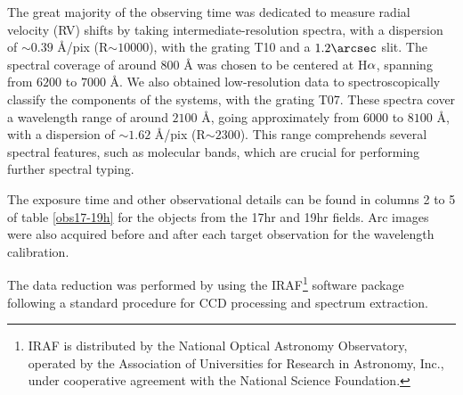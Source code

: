 \documentclass[fleqn,usenatbib]{mnras}
\begin{document}
The great majority of the observing time was dedicated to measure radial velocity (RV) shifts by taking intermediate-resolution spectra, with a dispersion of $\sim$$0.39$ \AA/pix (R$\sim$$10000$), with the grating T10 and a $1.2\arcsec$ slit. The spectral coverage of around $800$ \AA$ $ was chosen to be centered at H${\rm \alpha}$, spanning from $6200$ to $7000$ \AA. We also obtained low-resolution data to spectroscopically classify the components of the systems, with the grating T07. These spectra cover a wavelength range of around $2100$ \AA, going approximately from $6000$ to $8100$ \AA, with a dispersion of $\sim$$1.62$ \AA/pix (R$\sim$$2300$). This range comprehends several spectral features, such as molecular bands, which are crucial for performing further spectral typing.

The exposure time and other observational details can be found in columns 2 to 5 of table \ref{obs17-19h} 
for the objects from the 17hr and 19hr fields. Arc images were also acquired before and after each target observation for the wavelength calibration.

The data reduction was performed by using the IRAF\footnote{IRAF is distributed by the National Optical Astronomy Observatory, operated by the Association of Universities for Research in Astronomy, Inc., under cooperative agreement with the National Science Foundation.} software package following a standard procedure for CCD processing and spectrum extraction.
\end{document}
